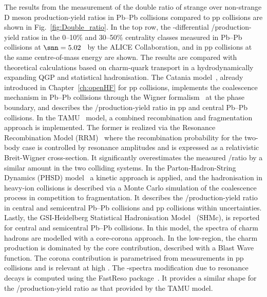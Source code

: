 The results from the measurement of the double ratio of strange over non-strange D meson production-yield ratios in Pb--Pb collisions compared to pp collisions are shown in Fig.~\ref{fig:Double_ratio}. In the top row, the \pt-differential \ds/\dz production-yield ratios in the 0--10\% and 30--50\% centrality classes measured in Pb--Pb collisions at \mbox{$\snn=5.02$~\tev} by the ALICE Collaboration, and in pp collisions at the same centre-of-mass energy are shown. The results are compared with theoretical calculations based on charm-quark transport in a hydrodynamically expanding QGP and statistical hadronisation. The Catania model~\cite{Plumari:2017ntm,Scardina:2017ipo}, already introduced in Chapter~\ref{ch:openHF} for pp collisions, implements the coalescence mechanism in Pb--Pb collisions through the Wigner formalism~\cite{Dover:1991zn} at the phase boundary, and describes the \ds/\dz production-yield ratio in pp and central Pb--Pb collisions. In the TAMU~\cite{He:2014cla} model, a combined recombination and fragmentation approach is implemented. The former is realized via the Resonance Recombination Model (RRM)~\cite{Ravagli:2007xx} where the recombination probability for the two-body case is controlled by resonance amplitudes and is expressed as a relativistic Breit-Wigner cross-section. It significantly overestimates the measured \ds/\dz ratio by a similar amount in the two colliding systems. In the Parton-Hadron-String Dynamics (PHSD) model~\cite{Song:2015sfa} a kinetic approach is applied, and the hadronisation in heavy-ion collisions is described via a Monte Carlo simulation of the coalescence process in competition to fragmentation. It describes the \ds/\dz production-yield ratio in central and semicentral Pb--Pb collisions and pp collisions within uncertainties. Lastly, the GSI-Heidelberg Statistical Hadronisation Model~\cite{Andronic:2021erx} (SHMc), is reported for central and semicentral Pb--Pb collisions. In this model, the \pt spectra of charm hadrons are modelled with a core-corona approach. In the low-\pt region, the charm production is dominated by the core contribution, described with a Blast Wave function. The corona contribution is parametrised from measurements in pp collisions and is relevant at high \pt. The \pt-spectra modification due to resonance decays is computed using the FastReso package~\cite{Mazeliauskas:2018irt}. It provides a similar \pt shape for the \ds/\dz production-yield ratio as that provided by the TAMU model.


